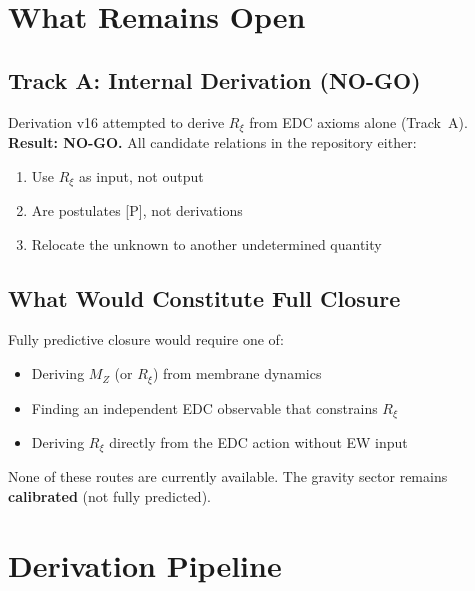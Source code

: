 \documentclass[11pt,a4paper]{article}
\newcommand{\Rxi}{R_\xi}
\newcommand{\MZ}{M_Z}
\begin{document}
\section{What Remains Open}

\subsection{Track A: Internal Derivation (NO-GO)}

Derivation v16 attempted to derive $\Rxi$ from EDC axioms alone (Track~A).
\textbf{Result: NO-GO.} All candidate relations in the repository either:
\begin{enumerate}
\item Use $\Rxi$ as input, not output
\item Are postulates [P], not derivations
\item Relocate the unknown to another undetermined quantity
\end{enumerate}

\subsection{What Would Constitute Full Closure}

Fully predictive closure would require one of:
\begin{itemize}
\item Deriving $\MZ$ (or $\Rxi$) from membrane dynamics
\item Finding an independent EDC observable that constrains $\Rxi$
\item Deriving $\Rxi$ directly from the EDC action without EW input
\end{itemize}

None of these routes are currently available. The gravity sector remains
\textbf{calibrated} (not fully predicted).

\section{Derivation Pipeline}
\end{document}
